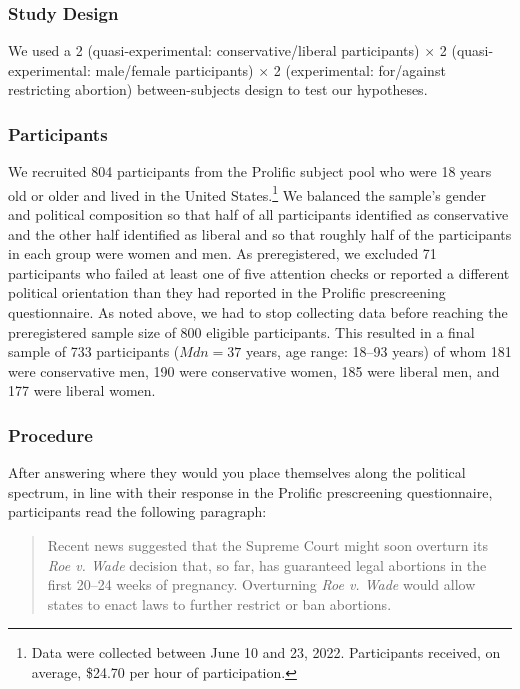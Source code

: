 \documentclass[twocolumn, 11pt, letterpaper]{article}
\begin{document}
\hypertarget{study-design-2}{%
\subsubsection{Study Design}\label{study-design-2}}

We used a 2 (quasi-experimental: conservative/liberal participants)
\(\times\) 2 (quasi-experimental: male/female participants) \(\times\) 2
(experimental: for/against restricting abortion) between-subjects design
to test our hypotheses.

\hypertarget{participants-2}{%
\subsubsection{Participants}\label{participants-2}}

We recruited 804 participants from the Prolific subject pool who were 18
years old or older and lived in the United States.\footnote{Data were
  collected between June 10 and 23, 2022. Participants received, on
  average, \$24.70 per hour of participation.} We balanced the sample's
gender and political composition so that half of all participants
identified as conservative and the other half identified as liberal and
so that roughly half of the participants in each group were women and
men. As preregistered, we excluded 71 participants who failed at least
one of five attention checks or reported a different political
orientation than they had reported in the Prolific prescreening
questionnaire. As noted above, we had to stop collecting data before
reaching the preregistered sample size of 800 eligible participants.
This resulted in a final sample of 733 participants
(\(\textit{Mdn} = 37\) years, age range: 18--93 years) of whom 181 were
conservative men, 190 were conservative women, 185 were liberal men, and
177 were liberal women.

\hypertarget{procedure-2}{%
\subsubsection{Procedure}\label{procedure-2}}

After answering where they would you place themselves along the
political spectrum, in line with their response in the Prolific
prescreening questionnaire, participants read the following paragraph:

\begin{quote}
Recent news suggested that the Supreme Court might soon overturn its
\emph{Roe v. Wade} decision that, so far, has guaranteed legal abortions
in the first 20--24 weeks of pregnancy. Overturning \emph{Roe v. Wade}
would allow states to enact laws to further restrict or ban abortions.
\end{quote}
\end{document}
